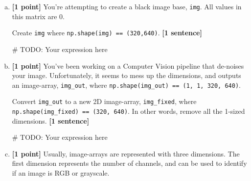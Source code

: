 \documentclass[11pt]{article}
\begin{document}
\begin{enumerate}[(a)]
    \item \textbf{[1 point]} You're attempting to create a black image base, \texttt{img}. All values in this matrix are 0. 
    
    \begin{tcolorbox}[colback=orange!5!white,colframe=orange!75!black]
    Create \texttt{img} where \texttt{np.shape(img) == (320,640)}. \textbf{[1 sentence]}
    \end{tcolorbox}
    
    \begin{tcolorbox}[colback=white!5!white,colframe=green!75!black,height=2cm]
    \begin{python}
    # TODO: Your expression here %
    \end{python}
    \end{tcolorbox}
    
    \item \textbf{[1 point]} You've been working on a Computer Vision pipeline that de-noises your image. Unfortunately, it seems to mess up the dimensions, and outputs an image-array, \texttt{img\_out}, where \texttt{np.shape(img\_out) == (1, 1, 320, 640)}. 
    
    \begin{tcolorbox}[colback=orange!5!white,colframe=orange!75!black]
    Convert \texttt{img\_out} to a new 2D image-array, \texttt{img\_fixed}, where \texttt{np.shape(img\_fixed) == (320, 640)}. In other words, remove all the 1-sized dimensions. \textbf{[1 sentence]}
    \end{tcolorbox}

\begin{tcolorbox}[colback=white!5!white,colframe=green!75!black,height=2cm]
    \begin{python}
    # TODO: Your expression here
    \end{python}
    \end{tcolorbox}
    
    \item \textbf{[1 point]} Usually, image-arrays are represented with three dimensions. The first dimension represents the number of channels, and can be used to identify if an image is RGB or grayscale. 
    

\end{enumerate}
\end{document}
